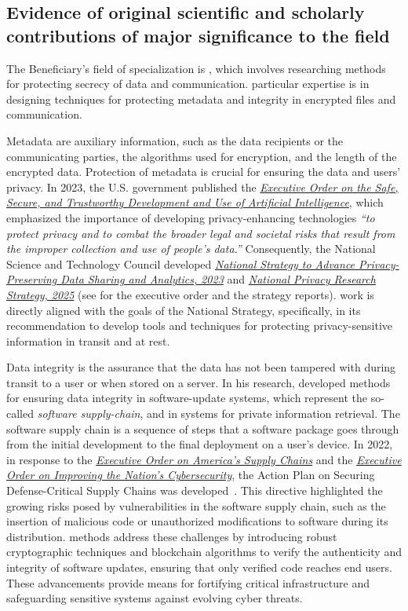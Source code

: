 \subsection{Evidence of \drs original scientific and scholarly contributions 
	of major significance to the field}
\label{sec:contributions}

The Beneficiary's field of specialization is \dpcs, which involves researching
methods for protecting secrecy of data and communication.
\drs particular expertise is in designing techniques for protecting metadata and
integrity in encrypted files and communication.

Metadata are auxiliary information, such as the data recipients or the
communicating parties, the algorithms used for encryption, and the length of the
encrypted data. 
Protection of metadata is crucial for ensuring the data and users' privacy.
In 2023, the U.S. government published the \textit{\uline{Executive Order on the
Safe, Secure, and Trustworthy Development and Use of Artificial Intelligence}},
which emphasized the importance of developing privacy-enhancing technologies
\textit{``to protect privacy and to combat the broader legal and societal risks
that result from the improper collection and use of people’s data.''}
Consequently, the National Science and Technology Council developed
\textit{\uline{National Strategy to Advance Privacy-Preserving Data Sharing
and Analytics, 2023}} and \textit{\uline{National Privacy Research Strategy,
2025}} (see  for the executive order and the strategy
reports).
\drs work is directly aligned with the goals of the National Strategy,
specifically, in its recommendation to develop tools and techniques for
protecting privacy-sensitive information in transit and at rest.

Data integrity is the assurance that the data has not been tampered with during
transit to a user or when stored on a server.
In his research, \dr developed methods for ensuring data integrity in
software-update systems, which represent the so-called \textit{software
supply-chain}, and in systems for private information retrieval.
The software supply chain is a sequence of steps that a software package goes
through from the initial development to the final deployment on a user's device.
In 2022, in response to the \textit{\uline{Executive Order on America's Supply
Chains}} and the \textit{\uline{Executive Order on Improving the Nation’s
Cybersecurity}}, the Action Plan on Securing Defense-Critical Supply Chains was
developed~\cite{government}.
This directive highlighted the growing risks posed by vulnerabilities in the
software supply chain, such as the insertion of malicious code or unauthorized
modifications to software during its distribution. 
\drs methods address these challenges by introducing robust cryptographic
techniques and blockchain algorithms to verify the authenticity and integrity of
software updates, ensuring that only verified code reaches end users.
These advancements provide means for fortifying critical infrastructure and
safeguarding sensitive systems against evolving cyber threats.

